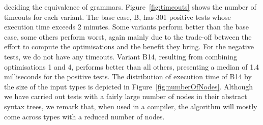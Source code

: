 deciding the equivalence of grammars. 
Figure~\ref{fig:timeouts} shows the number of timeouts for each variant.
The base case, B, has 301 positive tests whose execution time
exceeds 2 minutes. Some variants perform better than the base case, 
some others perform worst, again mainly due to the trade-off between the 
effort to compute the optimisations and the benefit they bring.
For the negative tests, we do not have any timeouts.
Variant B14, resulting from combining optimisations 1 and 4, 
performs better than all others, presenting a median of 1.4 milliseconds
for the positive tests. 
The distribution of execution time of B14 by the size of the input
types is depicted in Figure~\ref{fig:numberOfNodes}.
%
Although we have carried out tests with a
fairly large number of nodes in their abstract syntax trees, we remark
that, when used in a compiler, the algorithm will mostly come across
types with a reduced number of nodes.



